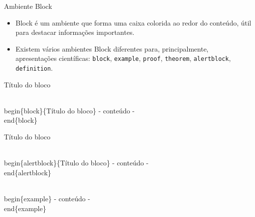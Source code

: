 \begin{frame}{Ambiente Block}
    \begin{itemize}
    \item Block é um ambiente que forma uma caixa colorida ao redor do conteúdo, útil para destacar informações importantes.
    \item Existem vários ambientes Block diferentes para, principalmente, apresentações científicas: \verb|block|, \verb|example|, \verb|proof|, \verb|theorem|, \verb|alertblock|, \verb|definition|.
    \end{itemize}

\newpage

    \begin{block}{Título do bloco}
\begin{semiverbatim}
\\begin\{block\}\{Título do bloco\}
  - conteúdo -
\\end\{block\}
\end{semiverbatim}
    \end{block}
   
   \begin{alertblock}{Título do bloco}
\begin{semiverbatim}
\\begin\{alertblock\}\{Título do bloco\}
  - conteúdo -
\\end\{alertblock\}
\end{semiverbatim}
    \end{alertblock}

    \begin{example}
\begin{semiverbatim}
\\begin\{example\}
  - conteúdo -
\\end\{example\}
\end{semiverbatim}
    \end{example}

\end{frame}

